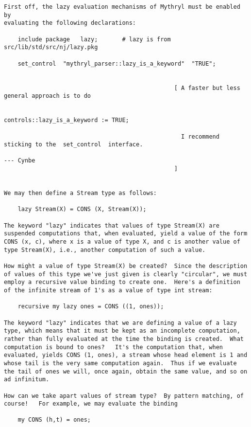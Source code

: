 \begin{verbatim}
First off, the lazy evaluation mechanisms of Mythryl must be enabled by 
evaluating the following declarations: 
 
    include package   lazy;       # lazy is from   src/lib/std/src/nj/lazy.pkg  
 
    set_control  "mythryl_parser::lazy_is_a_keyword"  "TRUE"; 
 
 
                                                 [ A faster but less general approach is to do 
 
                                                       controls::lazy_is_a_keyword := TRUE; 
 
                                                   I recommend sticking to the  set_control  interface. 
                                                                              --- Cynbe 
                                                 ] 
 
 
We may then define a Stream type as follows: 
 
    lazy Stream(X) = CONS (X, Stream(X)); 
 
The keyword "lazy" indicates that values of type Stream(X) are 
suspended computations that, when evaluated, yield a value of the form 
CONS (x, c), where x is a value of type X, and c is another value of 
type Stream(X), i.e., another computation of such a value. 
 
How might a value of type Stream(X) be created?  Since the description 
of values of this type we've just given is clearly "circular", we must 
employ a recursive value binding to create one.  Here's a definition 
of the infinite stream of 1's as a value of type int stream: 
 
    recursive my lazy ones = CONS ((1, ones)); 
 
The keyword "lazy" indicates that we are defining a value of a lazy 
type, which means that it must be kept as an incomplete computation, 
rather than fully evaluated at the time the binding is created.  What 
computation is bound to ones?   It's the computation that, when 
evaluated, yields CONS (1, ones), a stream whose head element is 1 and 
whose tail is the very same computation again.  Thus if we evaluate 
the tail of ones we will, once again, obtain the same value, and so on 
ad infinitum. 
 
How can we take apart values of stream type?  By pattern matching, of 
course!   For example, we may evaluate the binding 
 
    my CONS (h,t) = ones; 
 

\end{verbatim}

